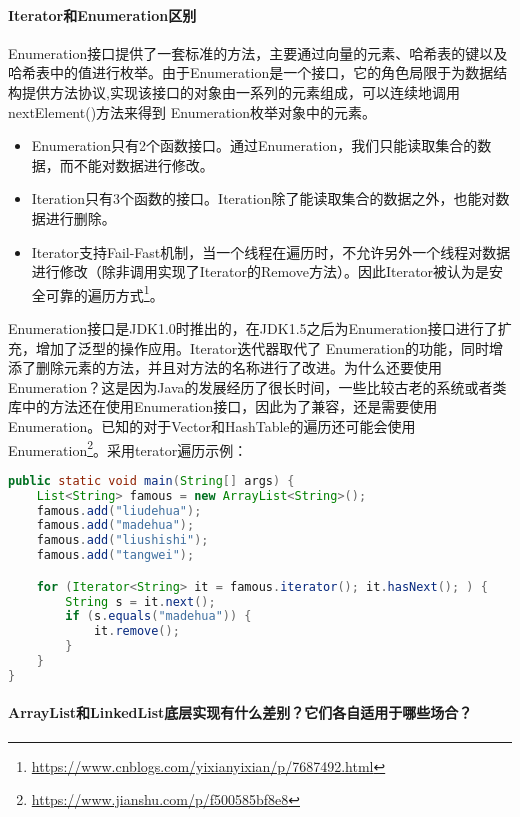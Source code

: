 \documentclass[../../../interview-questions.tex]{subfiles}
\begin{document}
\paragraph{Iterator和Enumeration区别}

Enumeration接口提供了一套标准的方法，主要通过向量的元素、哈希表的键以及哈希表中的值进行枚举。由于Enumeration是一个接口，它的角色局限于为数据结构提供方法协议,实现该接口的对象由一系列的元素组成，可以连续地调用nextElement()方法来得到 Enumeration枚举对象中的元素。

\begin{itemize}
    \item {Enumeration只有2个函数接口。通过Enumeration，我们只能读取集合的数据，而不能对数据进行修改。}
    \item {Iteration只有3个函数的接口。Iteration除了能读取集合的数据之外，也能对数据进行删除。}
    \item {Iterator支持Fail-Fast机制，当一个线程在遍历时，不允许另外一个线程对数据进行修改（除非调用实现了Iterator的Remove方法）。因此Iterator被认为是安全可靠的遍历方式\footnote{\url{https://www.cnblogs.com/yixianyixian/p/7687492.html}}。}
\end{itemize}

Enumeration接口是JDK1.0时推出的，在JDK1.5之后为Enumeration接口进行了扩充，增加了泛型的操作应用。Iterator迭代器取代了 Enumeration的功能，同时增添了删除元素的方法，并且对方法的名称进行了改进。为什么还要使用Enumeration？这是因为Java的发展经历了很长时间，一些比较古老的系统或者类库中的方法还在使用Enumeration接口，因此为了兼容，还是需要使用Enumeration。已知的对于Vector和HashTable的遍历还可能会使用Enumeration\footnote{\url{https://www.jianshu.com/p/f500585bf8e8}}。采用terator遍历示例：

\begin{lstlisting}[language=Java]
public static void main(String[] args) {
    List<String> famous = new ArrayList<String>();
    famous.add("liudehua");
    famous.add("madehua");
    famous.add("liushishi");
    famous.add("tangwei");

    for (Iterator<String> it = famous.iterator(); it.hasNext(); ) {
        String s = it.next();
        if (s.equals("madehua")) {
            it.remove();
        }
    }
}
\end{lstlisting}

\paragraph{ArrayList和LinkedList底层实现有什么差别？它们各自适用于哪些场合？}
\end{document}
